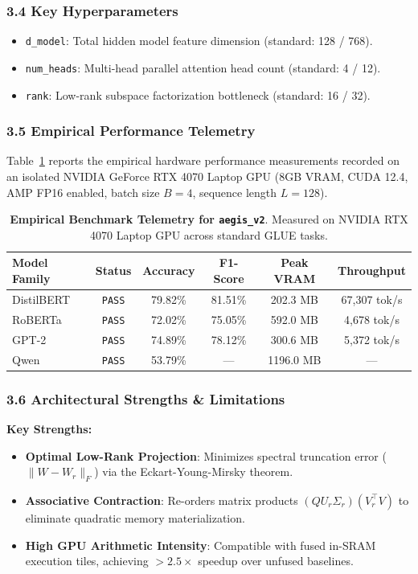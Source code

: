 \subsubsection*{3.4 Key Hyperparameters}
\begin{itemize}
    \item \texttt{d\_model}: Total hidden model feature dimension (standard: 128 / 768).
    \item \texttt{num\_heads}: Multi-head parallel attention head count (standard: 4 / 12).
    \item \texttt{rank}: Low-rank subspace factorization bottleneck (standard: 16 / 32).
\end{itemize}

\subsubsection*{3.5 Empirical Performance Telemetry}
Table~\ref{tab:telemetry_aegis_v2} reports the empirical hardware performance measurements recorded on an isolated NVIDIA GeForce RTX 4070 Laptop GPU (8GB VRAM, CUDA 12.4, AMP FP16 enabled, batch size $B=4$, sequence length $L=128$).

\begin{table}[h]
\centering
\small
\caption{\textbf{Empirical Benchmark Telemetry for \texttt{aegis\_v2}}. Measured on NVIDIA RTX 4070 Laptop GPU across standard GLUE tasks.}
\label{tab:telemetry_aegis_v2}
\begin{tabular*}{\columnwidth}{@{\extracolsep{\fill}}lccccc}
\toprule
\textbf{Model Family} & \textbf{Status} & \textbf{Accuracy} & \textbf{F1-Score} & \textbf{Peak VRAM} & \textbf{Throughput} \\
\midrule
DistilBERT & \texttt{PASS} & 79.82\% & 81.51\% & 202.3 MB & 67,307 tok/s \\
RoBERTa & \texttt{PASS} & 72.02\% & 75.05\% & 592.0 MB & 4,678 tok/s \\
GPT-2 & \texttt{PASS} & 74.89\% & 78.12\% & 300.6 MB & 5,372 tok/s \\
Qwen & \texttt{PASS} & 53.79\% & --- & 1196.0 MB & --- \\
\bottomrule
\end{tabular*}
\end{table}

\subsubsection*{3.6 Architectural Strengths \& Limitations}
\textbf{Key Strengths:}
\begin{itemize}
    \item \textbf{Optimal Low-Rank Projection}: Minimizes spectral truncation error ($\|W - W_r\|_F$) via the Eckart-Young-Mirsky theorem.
    \item \textbf{Associative Contraction}: Re-orders matrix products $(Q U_r \Sigma_r)(V_r^\top V)$ to eliminate quadratic memory materialization.
    \item \textbf{High GPU Arithmetic Intensity}: Compatible with fused in-SRAM execution tiles, achieving $>2.5\times$ speedup over unfused baselines.
\end{itemize}

